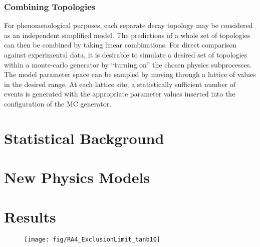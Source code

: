 \subsubsection{Combining Topologies}
For phenomenological purposes, each separate decay topology may be considered as
an independent simplified model. The predictions of a whole set of topologies
can then be combined by taking linear combinations. For direct comparison
against experimental data, it is desirable to simulate a desired set of
topologies within a monte-carlo generator by ``turning on'' the chosen physics
subprocesses. The model parameter space can be sampled by moving through a
lattice of values in the desired range. At each lattice site, a statistically
sufficient number of events is generated with the appropriate parameter values
inserted into the configuration of the \ac{MC} generator.

\section{Statistical Background}

\section{New Physics Models}
\section{Results}

\begin{figure}
\texttt{[image: fig/RA4\_ExclusionLimit\_tanb10]}
\end{figure}
